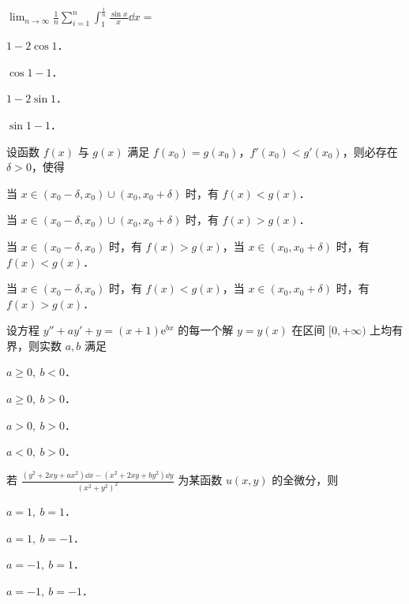 
\begin{question}[index=1]
$\displaystyle\lim_{n\to\infty}\frac{1}{n}\sum_{i=1}^{n}
\int_1^{\frac{i}{n}}\frac{\sin x}{x}\dd x=$
\begin{choices}[columns=2]
\item $1-2\cos 1$．
\item $\cos 1-1$．
\item $1-2\sin 1$．
\item $\sin 1-1$．
\end{choices}
\end{question}
\QuestionBreak

\begin{question}[index=2]
设函数 $f(x)$ 与 $g(x)$ 满足 $f(x_0)=g(x_0)$，$f'(x_0)<g'(x_0)$，则必存在 $\delta>0$，使得
\begin{choices}[columns=1]
\item 当 $x\in(x_0-\delta,x_0)\cup(x_0,x_0+\delta)$ 时，有 $f(x)<g(x)$．
\item 当 $x\in(x_0-\delta,x_0)\cup(x_0,x_0+\delta)$ 时，有 $f(x)>g(x)$．
\item 当 $x\in(x_0-\delta,x_0)$ 时，有 $f(x)>g(x)$，当 $x\in(x_0,x_0+\delta)$ 时，有 $f(x)<g(x)$．
\item 当 $x\in(x_0-\delta,x_0)$ 时，有 $f(x)<g(x)$，当 $x\in(x_0,x_0+\delta)$ 时，有 $f(x)>g(x)$．
\end{choices}
\end{question}
\QuestionBreak

\begin{question}[index=3]
设方程 $y''+ay'+y=(x+1)\mathrm e^{bx}$ 的每一个解 $y=y(x)$ 在区间 $[0,+\infty)$ 上均有界，则实数 $a,b$ 满足
\begin{choices}[columns=4]
\item $a\geq 0,\ b<0$．
\item $a\geq 0,\ b>0$．
\item $a>0,\ b>0$．
\item $a<0,\ b>0$．
\end{choices}
\end{question}
\QuestionBreak

\begin{question}[index=4]
若 $\displaystyle\frac{(y^2+2xy+ax^2)\dd x-(x^2+2xy+by^2)\dd y}{(x^2+y^2)^2}$ 为某函数 $u(x,y)$ 的全微分，则
\begin{choices}[columns=2]
\item $a=1,\ b=1$．
\item $a=1,\ b=-1$．
\item $a=-1,\ b=1$．
\item $a=-1,\ b=-1$．
\end{choices}
\end{question}
\QuestionBreak

